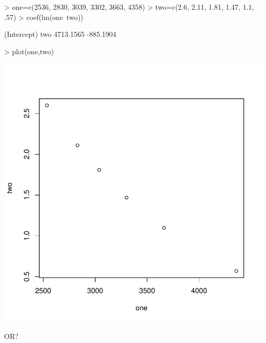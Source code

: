 \documentclass{article}
\begin{document}
\begin{Schunk}
\begin{Sinput}
> one=c(2536, 2830, 3039, 3302, 3663, 4358)
> two=c(2.6, 2.11, 1.81, 1.47, 1.1, .57)
> coef(lm(one~two))
\end{Sinput}
\begin{Soutput}
(Intercept)         two 
  4713.1565   -885.1904 
\end{Soutput}
\begin{Sinput}
> plot(one,two)
\end{Sinput}
\end{Schunk}
\includegraphics{Chemistry1-003}

OR?
\end{document}
